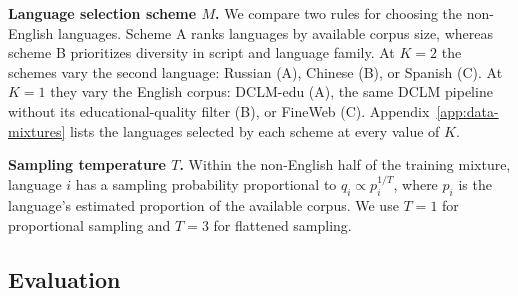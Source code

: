 \textbf{Language selection scheme $M$.}
We compare two rules for choosing the non-English languages. Scheme A ranks languages by available corpus size, whereas scheme B prioritizes diversity in script and language family.
At $K=2$ the schemes vary the second language: Russian (A), Chinese (B), or Spanish (C). At $K=1$ they vary the English corpus: DCLM-edu (A), the same DCLM pipeline without its educational-quality filter (B), or FineWeb (C).
Appendix~\ref{app:data-mixtures} lists the languages selected by each scheme at every value of $K$.

\textbf{Sampling temperature $T$.}
Within the non-English half of the training mixture, language $i$ has a sampling probability proportional to
$q_i \propto p_i^{1/T}$,
where $p_i$ is the language's estimated proportion of the available corpus. We use $T=1$ for proportional sampling and $T=3$ for flattened sampling.




\subsection{Evaluation}
\label{subsec:evaluation}

